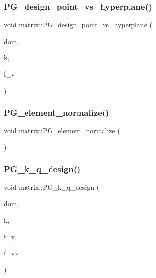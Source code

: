 \mbox{\label{classmatrix_adece30f74509652851c31e2d82e141e3}} 
\subsubsection{\texorpdfstring{P\+G\+\_\+design\+\_\+point\+\_\+vs\+\_\+hyperplane()}{PG\_design\_point\_vs\_hyperplane()}}
{\footnotesize\ttfamily void matrix\+::\+P\+G\+\_\+design\+\_\+point\+\_\+vs\+\_\+hyperplane (\begin{DoxyParamCaption}\item[{\mbox{\hyperlink{classdomain}{domain}} $\ast$}]{dom,  }\item[{\mbox{\hyperlink{galois_8h_a09fddde158a3a20bd2dcadb609de11dc}{I\+NT}}}]{k,  }\item[{\mbox{\hyperlink{galois_8h_a09fddde158a3a20bd2dcadb609de11dc}{I\+NT}}}]{f\+\_\+v }\end{DoxyParamCaption})}

\mbox{\label{classmatrix_a441ad781cca88e28fce80ddba988306f}} 
\subsubsection{\texorpdfstring{P\+G\+\_\+element\+\_\+normalize()}{PG\_element\_normalize()}}
{\footnotesize\ttfamily void matrix\+::\+P\+G\+\_\+element\+\_\+normalize (\begin{DoxyParamCaption}{ }\end{DoxyParamCaption})}

\mbox{\label{classmatrix_ae05463d97ecc8ea3654c45a399b872e2}} 
\subsubsection{\texorpdfstring{P\+G\+\_\+k\+\_\+q\+\_\+design()}{PG\_k\_q\_design()}}
{\footnotesize\ttfamily void matrix\+::\+P\+G\+\_\+k\+\_\+q\+\_\+design (\begin{DoxyParamCaption}\item[{\mbox{\hyperlink{classdomain}{domain}} $\ast$}]{dom,  }\item[{\mbox{\hyperlink{galois_8h_a09fddde158a3a20bd2dcadb609de11dc}{I\+NT}}}]{k,  }\item[{\mbox{\hyperlink{galois_8h_a09fddde158a3a20bd2dcadb609de11dc}{I\+NT}}}]{f\+\_\+v,  }\item[{\mbox{\hyperlink{galois_8h_a09fddde158a3a20bd2dcadb609de11dc}{I\+NT}}}]{f\+\_\+vv }\end{DoxyParamCaption})}

